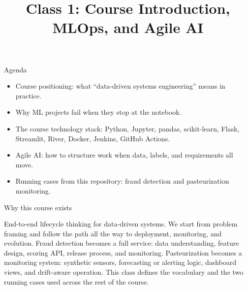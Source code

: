 

\title{Class 1: Course Introduction, MLOps, and Agile AI}
\author{\coursename}
\date{}



\frame{\titlepage \coursefooter}

\begin{frame}{Agenda}
\begin{itemize}
\item Course positioning: what ``data-driven systems engineering'' means in practice.
\item Why ML projects fail when they stop at the notebook.
\item The course technology stack: Python, Jupyter, pandas, scikit-learn, Flask, Streamlit, River, Docker, Jenkins, GitHub Actions.
\item Agile AI: how to structure work when data, labels, and requirements all move.
\item Running cases from this repository: fraud detection and pasteurization monitoring.
\end{itemize}
\coursefooter
\end{frame}

\begin{frame}{Why this course exists}
\coursefooter
\end{frame}

\coursecontextframe
{End-to-end lifecycle thinking for data-driven systems.}
{We start from problem framing and follow the path all the way to deployment, monitoring, and evolution.}
{Fraud detection becomes a full service: data understanding, feature design, scoring API, release process, and monitoring.}
{Pasteurization becomes a monitoring system: synthetic sensors, forecasting or alerting logic, dashboard views, and drift-aware operation.}
{This class defines the vocabulary and the two running cases used across the rest of the course.}

